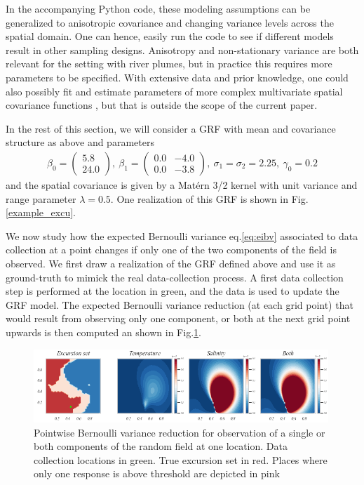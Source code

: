 \documentclass[aoas]{imsart}
\begin{document}
In the accompanying Python code, these modeling assumptions can be
generalized to anisotropic covariance and changing variance levels
across the spatial domain. One can hence, easily run the code to see
if different models result in other sampling designs. Anisotropy and
non-stationary variance are both relevant for the setting with river
plumes, but in practice this requires more parameters to be
specified. With extensive data and prior knowledge, one could also
possibly fit and estimate parameters of more complex multivariate
spatial covariance functions
\citep{gneiting2010matern,genton2015cross}, but that is outside the
scope of the current paper.

In the rest of this section, we will consider a GRF with mean and covariance structure as above and parameters
\begin{align*}
\beta_0 = \begin{pmatrix}
5.8\\ 24.0
\end{pmatrix}, ~ \beta_1 = \begin{pmatrix}
0.0 & -4.0\\
0.0 & -3.8
\end{pmatrix},~ \sigma_1 = \sigma_2 = 2.25, ~ \gamma_0 = 0.2
\end{align*}
and the spatial covariance is given by a Mat\'{e}rn 3/2 kernel with unit variance and range parameter $\lambda=0.5$.
One realization of this GRF is shown in Fig. \ref{example_excu}.

We now study how the expected Bernoulli variance eq.\ref{eq:eibv} associated to data collection at a point changes if only one of the two components of the field is observed. We first draw a realization of the GRF defined above and use it as ground-truth to mimick the real data-collection process. A first data collection step is performed at the location in green, and the data is used to update the GRF model. The expected Bernoulli variance reduction (at each grid point) that would result from observing only one component, or both at the next grid point upwards is then computed an shown in Fig.\ref{fig:ebv_comp}.

\begin{figure}[h!] \centering
  \includegraphics[width=0.99\textwidth]{Figures/ebv_comp.png}
  \caption{Pointwise Bernoulli variance reduction for observation of a single or both components of the random field at one location. Data collection locations in green. True excursion set in red. Places where only one response is above threshold are depicted in pink}
\label{fig:ebv_comp}
\end{figure}
\end{document}
